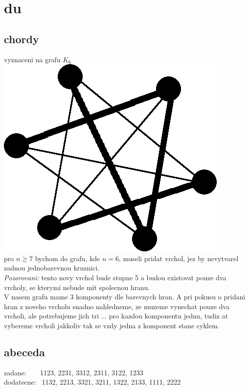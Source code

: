 \documentclass[a4paper]{article}
\begin{document}
\pagestyle{fancy}

\setcounter{section}{3}
\section{du}
\subsection{chordy}
vyznaceni na grafu $K_6$\\
\includegraphics[width=.3\textwidth]{chords.png}\\
pro $n\geq7$ bychom do grafu, kde $n=6$, museli pridat vrchol,
jez by nevytvarel zadnou jednobarevnou kruznici.\\
\textit{Pozorovani:} tento novy vrchol bude stupne 5
a budou existovat pouze dva vrcholy,
se kterymi nebude mit spolecnou hranu.\\
V nasem grafu mame 3 komponenty dle barevnych hran.
A pri pokusu o pridani hran z noveho vrcholu snadno nahledneme,
ze muzeme vynechat pouze dva vrcholi, ale potrebujeme jich tri ... 
pro kazdou komponentu jednu, tudiz at vybereme vrcholi jakkoliv tak
se vzdy jedna z komponent stane cyklem.


\setcounter{subsection}{2}


\subsection{abeceda}
zadane: ~ ~	1123, 2231, 3312, 2311, 3122, 1233\\
dodatecne:~	1132, 2213, 3321, 3211, 1322, 2133, 1111, 2222
\end{document}
